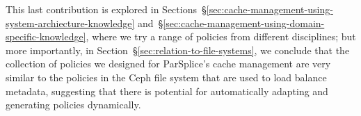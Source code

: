 
This last contribution is explored in
Sections~\S\ref{sec:cache-management-using-system-archiecture-knowledge}
and~\S\ref{sec:cache-management-using-domain-specific-knowledge}, where we try
a range of policies from different disciplines; but more importantly, in
Section~\S\ref{sec:relation-to-file-systems}, we conclude that the collection
of policies we designed for ParSplice's cache management are very similar to
the policies in the Ceph file system that are used to load balance metadata,
suggesting that there is potential for automatically adapting and generating
policies dynamically. 


